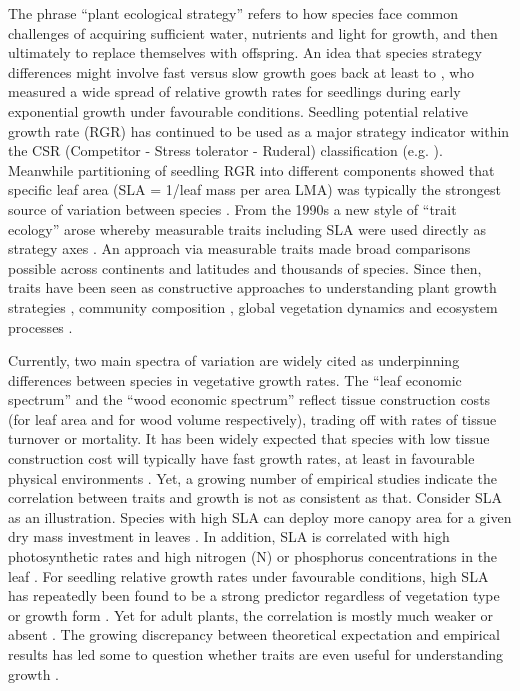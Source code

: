 \documentclass[a4paper,11pt]{article}
\begin{document}
The phrase ``plant ecological strategy'' refers to how species face common challenges of acquiring sufficient water, nutrients and light for growth, and then ultimately to replace themselves with offspring. An idea that species strategy differences might involve fast versus slow growth goes back at least to \citet{Grime:1975gr}, who measured a wide spread of relative growth rates for seedlings during early exponential growth under favourable conditions. Seedling potential relative growth rate (RGR) has continued to be used as a major strategy indicator within the CSR (Competitor - Stress tolerator - Ruderal) classification (e.g. \citealt{grime1979plant, Grime:1997wm}). Meanwhile partitioning of seedling RGR into different components showed that specific leaf area (SLA = 1/leaf mass per area LMA) was typically the strongest source of variation between species \citep{Poorter:1989tx}. From the 1990s a new style of ``trait ecology'' arose whereby measurable traits including SLA were used directly as strategy axes \citep{Westoby:2002ft}. An approach via measurable traits made broad comparisons possible across continents and latitudes and thousands of species. Since then, traits have been seen as constructive approaches to understanding plant growth strategies \citep{Grime:1977kc,Chapin:1980gz}, community composition \citep{Lavorel:2002ff,Shipley:2006ie}, global vegetation dynamics \citep{Scheiter:2013ed} and ecosystem processes \citep{Lavorel:2002ff}.

Currently, two main spectra of variation are widely cited as underpinning differences between species in vegetative growth rates. The ``leaf economic spectrum'' \citep{Wright:2004jb} and the ``wood economic spectrum'' \citep{Chave:2009iy} reflect tissue construction costs (for leaf area and for wood volume respectively), trading off with rates of tissue turnover or mortality. It has been widely expected that species with low tissue construction cost will typically have fast growth rates, at least in favourable physical environments \citep[e.g.][]{MullerLandau:2004dc,Wright:2004jb,Poorter:2008iu,Chave:2009iy,Larjavaara:2010bn,Iida:2012jb,Paine:2015df}. Yet, a growing number of empirical studies indicate the correlation between traits and growth is not as consistent as that. Consider SLA as an illustration. Species with high SLA can deploy more canopy area for a given dry mass investment in leaves \citep{Poorter:1999wd, Reich:1992wm}. In addition, SLA is correlated with high photosynthetic rates and high nitrogen (N) or phosphorus concentrations in the leaf \citep{Wright:2004jb}. For seedling relative growth rates under favourable conditions, high SLA has repeatedly been found to be a strong predictor regardless of vegetation type or growth form \citep{Lambers:1992bj,Reich:1992wm,Grime:1997wm,Poorter:1999wd,Wright:1999ds}. Yet for adult plants, the correlation is mostly much weaker or absent \citep{coomes_comparison_1998,Poorter:2008iu,Aiba:2009ft,Easdale:2009gv,Wright:2010tp}. The growing discrepancy between theoretical expectation and empirical results has led some to question whether traits are even useful for understanding growth \citep{Wright:2010tp, Paine:2015df}.
\end{document}
